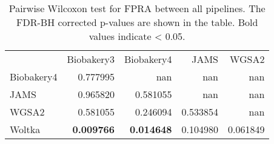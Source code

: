\begin{table}
\caption{Pairwise Wilcoxon test for FPRA between all pipelines. The FDR-BH corrected p-values are shown in the table. Bold values indicate < 0.05.}
\label{tab:pairwise_FPRA}
\begin{tabular}{lrrrr}
 & Biobakery3 & Biobakery4 & JAMS & WGSA2 \\
Biobakery4 & 0.777995 & nan & nan & nan \\
JAMS & 0.965820 & 0.581055 & nan & nan \\
WGSA2 & 0.581055 & 0.246094 & 0.533854 & nan \\
Woltka & \bfseries 0.009766 & \bfseries 0.014648 & 0.104980 & 0.061849 \\
\end{tabular}
\end{table}
